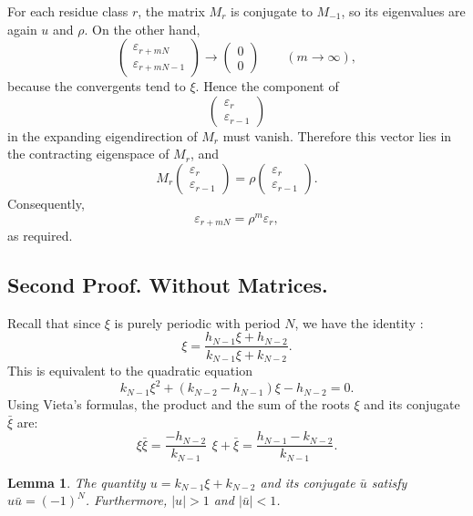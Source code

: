 \documentclass[]{interact}
\theoremstyle{plain}
\numberwithin{equation}{section} %
\newtheorem{lemma}[thm]{Lemma}
\numberwithin{table}{section} %
\numberwithin{figure}{section}
\begin{document}
For each residue class \(r\), the matrix \(M_r\) is conjugate to \(M_{-1}\),
so its eigenvalues are again \(u\) and \(\rho\). On the other hand,
\[
\begin{pmatrix}
\varepsilon_{r+mN}\\
\varepsilon_{r+mN-1}
\end{pmatrix}
\longrightarrow
\begin{pmatrix}
0\\
0
\end{pmatrix}
\qquad (m\to\infty),
\]
because the convergents tend to \(\xi\). Hence the component of
\[
\begin{pmatrix}
\varepsilon_r\\
\varepsilon_{r-1}
\end{pmatrix}
\]
in the expanding eigendirection of \(M_r\) must vanish. Therefore this vector
lies in the contracting eigenspace of \(M_r\), and
\[
M_r
\begin{pmatrix}
\varepsilon_r\\
\varepsilon_{r-1}
\end{pmatrix}
=
\rho
\begin{pmatrix}
\varepsilon_r\\
\varepsilon_{r-1}
\end{pmatrix}.
\]
Consequently,
\[
\varepsilon_{r+mN}=\rho^m\varepsilon_r,
\]
as required.







\subsection{Second Proof. Without Matrices.}

Recall that since $\xi$ is purely periodic with period $N$, we have the identity \cite{niven1991introduction}:
$$
\xi = \frac{h_{N-1}\xi + h_{N-2}}{k_{N-1}\xi + k_{N-2}}.
$$
This is equivalent to the quadratic equation
$$
k_{N-1}\xi^2 + (k_{N-2} - h_{N-1})\xi - h_{N-2} = 0.
$$
Using Vieta's formulas, the product and the sum of the roots $\xi$ and its conjugate $\bar{\xi}$ are:
$$
\xi \bar{\xi} = \frac{-h_{N-2}}{k_{N-1}} \, \ \xi + \bar{\xi} = \frac{h_{N-1} - k_{N-2}}{k_{N-1}} .
$$



\begin{lemma}\label{lm1}
The quantity $u=k_{N-1}\xi + k_{N-2}$ and its conjugate $\bar{u}$ satisfy $u\bar{u} = (-1)^N$. Furthermore, $|u| > 1$ and $|\bar{u}| < 1$.
\end{lemma}
\end{document}
